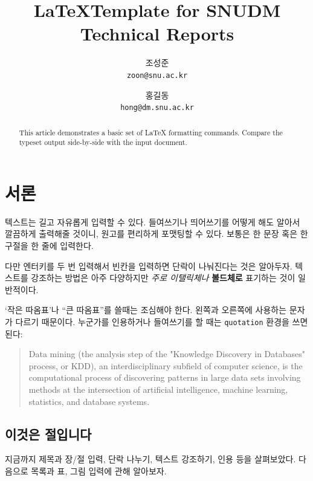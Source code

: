 \documentclass[11pt]{article}           %
\begin{document}
\title{\LaTeX Template for SNUDM Technical Reports}
\author{
  조성준\\
  \texttt{zoon@snu.ac.kr}
  \and
  홍길동\\
  \texttt{hong@dm.snu.ac.kr}
}
\maketitle

\begin{abstract}
This article demonstrates a basic set of LaTeX formatting commands.
Compare the typeset output side-by-side with the input document.
\end{abstract}

\section{서론}
텍스트는 길고 자유롭게 입력할 수 있다.
    들여쓰기나 띄어쓰기를 어떻게 해도
   알아서 깔끔하게 출력해줄 것이니, 원고를 편리하게 포맷팅할 수 있다.
보통은 한 문장 혹은 한 구절을 한 줄에 입력한다.

다만 엔터키를 두 번 입력해서 빈칸을 입력하면 단락이 나눠진다는 것은 알아두자.
텍스트를 강조하는 방법은 아주 다양하지만 \textit{주로 이탤릭체나} \textbf{볼드체로} 표기하는 것이 일반적이다.

`작은 따옴표'나 ``큰 따옴표''를 쓸때는 조심해야 한다.
왼쪽과 오른쪽에 사용하는 문자가 다르기 때문이다.
누군가를 인용하거나 들여쓰기를 할 때는 \verb+quotation+ 환경을 쓰면 된다:

\begin{quotation}
Data mining (the analysis step of the "Knowledge Discovery in Databases" process, or KDD), an interdisciplinary subfield of computer science, is the computational process of discovering patterns in large data sets involving methods at the intersection of artificial intelligence, machine learning, statistics, and database systems.~\cite{mucha2010community}
\end{quotation}

\subsection{이것은 절입니다}

지금까지 제목과 장/절 입력, 단락 나누기, 텍스트 강조하기, 인용 등을 살펴보았다.
다음으로 목록과 표, 그림 입력에 관해 알아보자.
\footnotemark[1]
\end{document}

